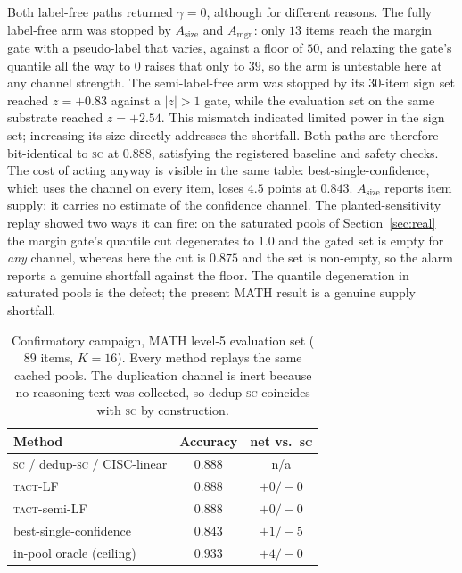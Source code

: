 \documentclass{article}
\newcommand{\SC}{\textsc{sc}}
\newcommand{\TACT}{\textsc{tact}}
\begin{document}
Both label-free paths returned $\gamma=0$, although for different reasons. The fully label-free arm was stopped by
$A_{\mathrm{size}}$ and $A_{\mathrm{mgn}}$: only
$13$ items reach the margin gate with a pseudo-label that varies, against a
floor of $50$, and relaxing the gate's quantile all the way to $0$ raises
that only to $39$, so the arm is untestable here at any channel strength.
The semi-label-free arm was stopped by its $30$-item
sign set reached $z=+0.83$ against a $|z|>1$ gate, while the evaluation set on
the same substrate reached $z=+2.54$. This mismatch indicated limited power in
the sign set; increasing its size directly addresses the shortfall. Both paths are therefore
bit-identical to \SC{} at $0.888$, satisfying the registered baseline and
safety checks. The cost of acting anyway is
visible in the same table: best-single-confidence, which uses the channel on
every item, loses $4.5$ points at $0.843$.
$A_{\mathrm{size}}$ reports item supply; it carries no estimate of the
confidence channel. The planted-sensitivity replay showed two ways it can
fire: on the saturated pools of Section~\ref{sec:real} the
margin gate's quantile cut degenerates to $1.0$ and the gated set is empty for
\emph{any} channel, whereas here the cut is $0.875$ and the set is non-empty,
so the alarm reports a genuine shortfall against the floor. The quantile
degeneration in saturated pools is the defect; the present MATH result is a
genuine supply shortfall.

\begin{table}[t]
\caption{Confirmatory campaign, MATH level-5 evaluation set ($89$ items,
$K{=}16$). Every method replays the same cached pools. The duplication
channel is inert because no reasoning text was collected, so dedup-\SC{}
coincides with \SC{} by construction.}
\label{tab:hard}
\centering\footnotesize
\setlength{\tabcolsep}{4pt}
\begin{tabular}{l c c}
\toprule
Method & Accuracy & net vs.\ \SC \\
\midrule
\SC{} / dedup-\SC{} / CISC-linear & $0.888$ & n/a \\
\TACT-LF & $0.888$ & $+0/-0$ \\
\TACT-semi-LF & $0.888$ & $+0/-0$ \\
best-single-confidence & $0.843$ & $+1/-5$ \\
\midrule
in-pool oracle (ceiling) & $0.933$ & $+4/-0$ \\
\bottomrule
\end{tabular}
\end{table}
\end{document}
